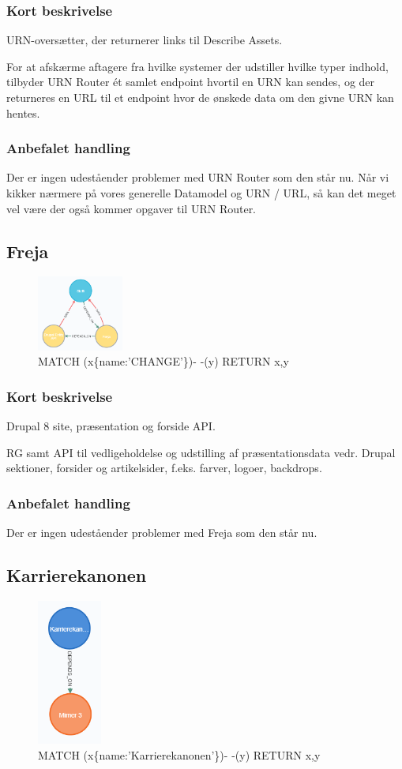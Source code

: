 \documentclass{article}
\begin{document}
\subsubsection*{Kort beskrivelse}
URN-oversætter, der returnerer links til Describe Assets.

For at afskærme aftagere fra hvilke systemer der udstiller hvilke typer indhold, tilbyder URN Router ét samlet endpoint hvortil en URN kan sendes, og der returneres en URL til et endpoint hvor de ønskede data om den givne URN kan hentes.
\subsubsection*{Anbefalet handling}
Der er ingen udeståender problemer med URN Router som den står nu. Når vi kikker nærmere på vores generelle Datamodel og URN / URL, så kan det meget vel være der også kommer opgaver til URN Router.


\subsection{Freja}
\begin{figure}[h]
\includegraphics[width=80pt]{Freja.PNG}
\caption{MATCH (x\{name:'CHANGE'\})- -(y) RETURN x,y}
\end{figure}
\subsubsection*{Kort beskrivelse}
Drupal 8 site, præsentation og forside API.	

RG samt API til vedligeholdelse og udstilling af præsentationsdata vedr. Drupal sektioner, forsider og artikelsider, f.eks. farver, logoer, backdrops.
\subsubsection*{Anbefalet handling}
Der er ingen udeståender problemer med Freja som den står nu.


\subsection{Karrierekanonen}
\begin{figure}[h]
\includegraphics[width=60pt]{Karrierekanonen.PNG}
\caption{MATCH (x\{name:'Karrierekanonen'\})- -(y) RETURN x,y}
\end{figure}
\end{document}
